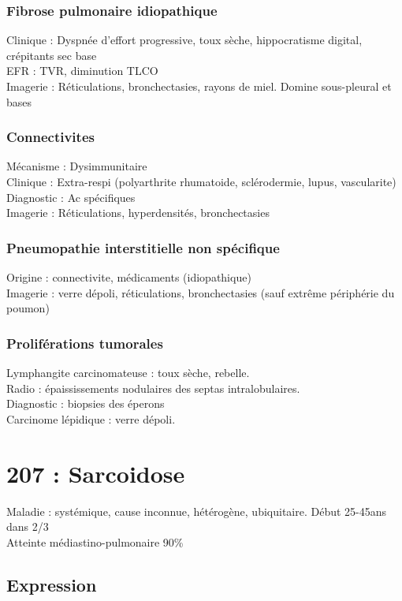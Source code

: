 \documentclass{article}
\begin{document}
\subsubsection{Fibrose pulmonaire idiopathique}
Clinique : Dyspnée d'effort progressive, toux sèche, hippocratisme digital, crépitants sec base\\
EFR : TVR, diminution TLCO\\
Imagerie : Réticulations, bronchectasies, rayons de miel. Domine sous-pleural et bases

\subsubsection{Connectivites}
Mécanisme : Dysimmunitaire\\
Clinique : Extra-respi (polyarthrite rhumatoide, sclérodermie, lupus, vascularite)\\
Diagnostic : Ac spécifiques\\
Imagerie : Réticulations, hyperdensités, bronchectasies

\subsubsection{Pneumopathie interstitielle non spécifique}
Origine : connectivite, médicaments (idiopathique)\\
Imagerie : verre dépoli, réticulations, bronchectasies (sauf extrême périphérie du poumon)

\subsubsection{Proliférations tumorales}
Lymphangite carcinomateuse : toux sèche, rebelle. \\
Radio : épaississements nodulaires des septas intralobulaires.\\
Diagnostic : biopsies des éperons\\
Carcinome lépidique : verre dépoli. 


\section{207 : Sarcoidose}
Maladie : systémique, cause inconnue, hétérogène, ubiquitaire. Début 25-45ans
dans 2/3\\
Atteinte médiastino-pulmonaire 90\%

\subsection{Expression}
\label{sec:org39048da}
\end{document}
